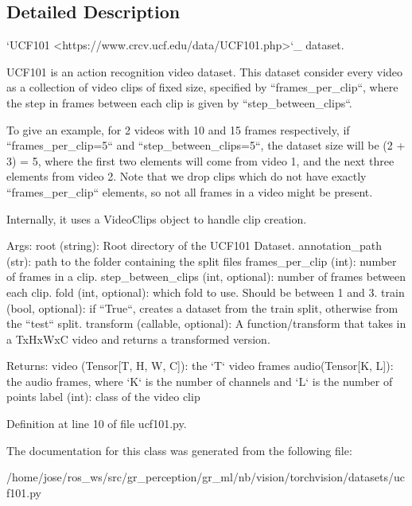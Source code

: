 \subsection{Detailed Description}
\begin{DoxyVerb}`UCF101 <https://www.crcv.ucf.edu/data/UCF101.php>`_ dataset.

UCF101 is an action recognition video dataset.
This dataset consider every video as a collection of video clips of fixed size, specified
by ``frames_per_clip``, where the step in frames between each clip is given by
``step_between_clips``.

To give an example, for 2 videos with 10 and 15 frames respectively, if ``frames_per_clip=5``
and ``step_between_clips=5``, the dataset size will be (2 + 3) = 5, where the first two
elements will come from video 1, and the next three elements from video 2.
Note that we drop clips which do not have exactly ``frames_per_clip`` elements, so not all
frames in a video might be present.

Internally, it uses a VideoClips object to handle clip creation.

Args:
    root (string): Root directory of the UCF101 Dataset.
    annotation_path (str): path to the folder containing the split files
    frames_per_clip (int): number of frames in a clip.
    step_between_clips (int, optional): number of frames between each clip.
    fold (int, optional): which fold to use. Should be between 1 and 3.
    train (bool, optional): if ``True``, creates a dataset from the train split,
        otherwise from the ``test`` split.
    transform (callable, optional): A function/transform that  takes in a TxHxWxC video
        and returns a transformed version.

Returns:
    video (Tensor[T, H, W, C]): the `T` video frames
    audio(Tensor[K, L]): the audio frames, where `K` is the number of channels
        and `L` is the number of points
    label (int): class of the video clip
\end{DoxyVerb}
 

Definition at line 10 of file ucf101.\+py.



The documentation for this class was generated from the following file\+:\begin{DoxyCompactItemize}
\item 
/home/jose/ros\+\_\+ws/src/gr\+\_\+perception/gr\+\_\+ml/nb/vision/torchvision/datasets/ucf101.\+py\end{DoxyCompactItemize}
